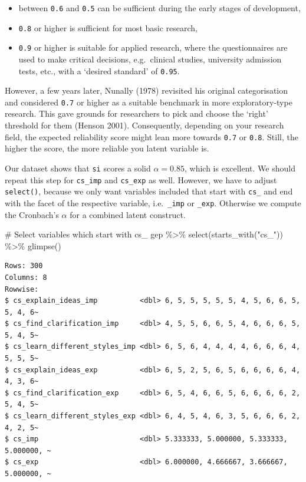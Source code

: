 \documentclass[
  letterpaper,
]{krantz}
\makeatletter
\newenvironment{Shaded}{\begin{snugshade}}{\end{snugshade}}
\newcommand{\CommentTok}[1]{\textcolor[rgb]{0.37,0.37,0.37}{#1}}
\newcommand{\FunctionTok}[1]{\textcolor[rgb]{0.28,0.35,0.67}{#1}}
\newcommand{\NormalTok}[1]{\textcolor[rgb]{0.00,0.23,0.31}{#1}}
\newcommand{\SpecialCharTok}[1]{\textcolor[rgb]{0.37,0.37,0.37}{#1}}
\newcommand{\StringTok}[1]{\textcolor[rgb]{0.13,0.47,0.30}{#1}}
\newenvironment{kframe}{%
\medskip{}
\setlength{\fboxsep}{.8em}
 \def\at@end@of@kframe{}%
 \ifinner\ifhmode%
  \def\at@end@of@kframe{\end{minipage}}%
  \begin{minipage}{\columnwidth}%
 \fi\fi%
 \def\FrameCommand##1{\hskip\@totalleftmargin \hskip-\fboxsep
 \colorbox{shadecolor}{##1}\hskip-\fboxsep
     \hskip-\linewidth \hskip-\@totalleftmargin \hskip\columnwidth}%
 \MakeFramed {\advance\hsize-\width
   \@totalleftmargin\z@ \linewidth\hsize
   \@setminipage}}%
 {\par\unskip\endMakeFramed%
 \at@end@of@kframe}
\renewenvironment{Shaded}{\begin{kframe}}{\end{kframe}}
\makeatother
\begin{document}
\begin{itemize}
\item
  between \texttt{0.6} and \texttt{0.5} can be sufficient during the
  early stages of development,
\item
  \texttt{0.8} or higher is sufficient for most basic research,
\item
  \texttt{0.9} or higher is suitable for applied research, where the
  questionnaires are used to make critical decisions, e.g.~clinical
  studies, university admission tests, etc., with a `desired standard'
  of \texttt{0.95}.
\end{itemize}

However, a few years later, Nunally (1978) revisited his original
categorisation and considered \texttt{0.7} or higher as a suitable
benchmark in more exploratory-type research. This gave grounds for
researchers to pick and choose the `right' threshold for them (Henson
2001). Consequently, depending on your research field, the expected
reliability score might lean more towards \texttt{0.7} or \texttt{0.8}.
Still, the higher the score, the more reliable you latent variable is.

Our dataset shows that \texttt{si} scores a solid \(\alpha = 0.85\),
which is excellent. We should repeat this step for \texttt{cs\_imp} and
\texttt{cs\_exp} as well. However, we have to adjust \texttt{select()},
because we only want variables included that start with \texttt{cs\_}
and end with the facet of the respective variable, i.e.~\texttt{\_imp}
or \texttt{\_exp}. Otherwise we compute the Cronbach's \(\alpha\) for a
combined latent construct.

\begin{Shaded}
\begin{Highlighting}[]
\CommentTok{\# Select variables which start with \textquotesingle{}cs\_\textquotesingle{}}
\NormalTok{gep }\SpecialCharTok{\%\textgreater{}\%}
  \FunctionTok{select}\NormalTok{(}\FunctionTok{starts\_with}\NormalTok{(}\StringTok{"cs\_"}\NormalTok{)) }\SpecialCharTok{\%\textgreater{}\%}
  \FunctionTok{glimpse}\NormalTok{()}
\end{Highlighting}
\end{Shaded}

\begin{verbatim}
Rows: 300
Columns: 8
Rowwise: 
$ cs_explain_ideas_imp          <dbl> 6, 5, 5, 5, 5, 5, 4, 5, 6, 6, 5, 5, 4, 6~
$ cs_find_clarification_imp     <dbl> 4, 5, 5, 6, 6, 5, 4, 6, 6, 6, 5, 5, 4, 5~
$ cs_learn_different_styles_imp <dbl> 6, 5, 6, 4, 4, 4, 4, 6, 6, 6, 4, 5, 5, 5~
$ cs_explain_ideas_exp          <dbl> 6, 5, 2, 5, 6, 5, 6, 6, 6, 6, 4, 4, 3, 6~
$ cs_find_clarification_exp     <dbl> 6, 5, 4, 6, 6, 5, 6, 6, 6, 6, 2, 5, 4, 5~
$ cs_learn_different_styles_exp <dbl> 6, 4, 5, 4, 6, 3, 5, 6, 6, 6, 2, 4, 2, 5~
$ cs_imp                        <dbl> 5.333333, 5.000000, 5.333333, 5.000000, ~
$ cs_exp                        <dbl> 6.000000, 4.666667, 3.666667, 5.000000, ~
\end{verbatim}
\end{document}
